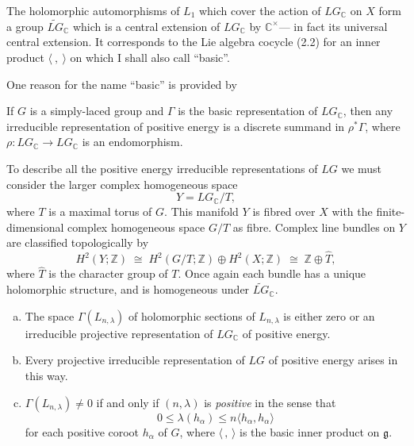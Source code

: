 \documentclass[12pt]{article}
\begin{document}
The holomorphic automorphisms of \(L_1\) which cover the action of \(LG_{\mathbb{C}}\) on \(X\)
form a group \(\widetilde{LG}_{\mathbb{C}}\) which is a central extension of \(LG_{\mathbb{C}}\) by \(\mathbb{C}^\times\)—
in fact its universal central extension.
It corresponds to the Lie algebra cocycle (2.2) for an inner product \(\langle\ ,\ \rangle\)
on which I shall also call ``basic''.

One reason for the name ``basic'' is provided by

\begin{proposition}
If \(G\) is a simply-laced group and \(\Gamma\) is the basic representation of \(LG_{\mathbb{C}}\),
then any irreducible representation of positive energy is a discrete summand in
\(\rho^*\Gamma\), where
\(\rho : LG_{\mathbb{C}} \to LG_{\mathbb{C}}\) is an endomorphism.
\end{proposition}

To describe all the positive energy irreducible representations of $LG$ we must consider the larger complex homogeneous space
\[
Y = LG_{\mathbb{C}} / T,
\]
where $T$ is a maximal torus of $G$.
This manifold $Y$ is fibred over $X$ with the finite-dimensional complex homogeneous space $G/T$ as fibre.
Complex line bundles on $Y$ are classified topologically by
\[
H^2(Y;\mathbb{Z}) \;\cong\;
H^2(G/T;\mathbb{Z}) \oplus H^2(X;\mathbb{Z})
\;\cong\; \mathbb{Z} \oplus \widehat{T},
\]
where $\widehat{T}$ is the character group of $T$.
Once again each bundle has a unique holomorphic structure,
and is homogeneous under $\widetilde{LG}_{\mathbb{C}}$. 

\begin{proposition}
\leavevmode
\begin{enumerate}[(a)]
\item
The space $\Gamma(L_{n,\lambda})$ of holomorphic sections of $L_{n,\lambda}$
is either zero or an irreducible projective representation of $LG_{\mathbb{C}}$
of positive energy.

\item
Every projective irreducible representation of $LG$ of positive energy
arises in this way.

\item
$\Gamma(L_{n,\lambda}) \neq 0$ if and only if $(n,\lambda)$ is
\emph{positive} in the sense that
\[
0 \le \lambda(h_{\alpha}) \le n\langle h_{\alpha},h_{\alpha}\rangle
\]
for each positive coroot $h_{\alpha}$ of $G$,
where $\langle\, ,\,\rangle$ is the basic inner product on $\mathfrak{g}$.
\end{enumerate}
\end{proposition}
\end{document}
